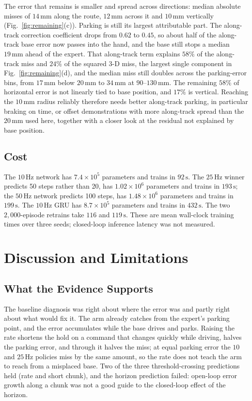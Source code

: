 \documentclass[conference]{IEEEtran}
\begin{document}
The error that remains is smaller and spread across directions: median absolute misses of $14\,\mathrm{mm}$ along the route, $12\,\mathrm{mm}$ across it and $10\,\mathrm{mm}$ vertically (Fig.~\ref{fig:remaining}(c)). Parking is still its largest attributable part. The along-track correction coefficient drops from $0.62$ to $0.45$, so about half of the along-track base error now passes into the hand, and the base still stops a median $19\,\mathrm{mm}$ ahead of the expert. That along-track term explains $58\%$ of the along-track miss and $24\%$ of the squared 3-D miss, the largest single component in Fig.~\ref{fig:remaining}(d), and the median miss still doubles across the parking-error bins, from $17\,\mathrm{mm}$ below $20\,\mathrm{mm}$ to $34\,\mathrm{mm}$ at $90$--$130\,\mathrm{mm}$. The remaining $58\%$ of horizontal error is not linearly tied to base position, and $17\%$ is vertical. Reaching the $10\,\mathrm{mm}$ radius reliably therefore needs better along-track parking, in particular braking on time, or offset demonstrations with more along-track spread than the $20\,\mathrm{mm}$ used here, together with a closer look at the residual not explained by base position.

\subsection{Cost}
The $10\,\mathrm{Hz}$ network has $7.4\times 10^{5}$ parameters and trains in $92\,\mathrm{s}$. The $25\,\mathrm{Hz}$ winner predicts 50 steps rather than 20, has $1.02\times 10^{6}$ parameters and trains in $193\,\mathrm{s}$; the $50\,\mathrm{Hz}$ network predicts 100 steps, has $1.48\times 10^{6}$ parameters and trains in $199\,\mathrm{s}$. The $10\,\mathrm{Hz}$ GRU has $8.7\times 10^{5}$ parameters and trains in $432\,\mathrm{s}$. The two $2{,}000$-episode retrains take $116$ and $119\,\mathrm{s}$. These are mean wall-clock training times over three seeds; closed-loop inference latency was not measured.

\section{Discussion and Limitations}
\subsection{What the Evidence Supports}
The baseline diagnosis was right about where the error was and partly right about what would fix it. The arm already catches from the expert's parking point, and the error accumulates while the base drives and parks. Raising the rate shortens the hold on a command that changes quickly while driving, halves the parking error, and through it halves the miss; at equal parking error the $10$ and $25\,\mathrm{Hz}$ policies miss by the same amount, so the rate does not teach the arm to reach from a misplaced base. Two of the three threshold-crossing predictions held (rate and short chunk), and the horizon prediction failed: open-loop error growth along a chunk was not a good guide to the closed-loop effect of the horizon.
\end{document}
